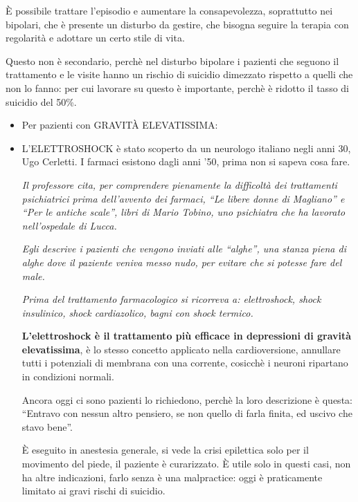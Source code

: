 \documentclass[]{article}
\begin{document}
È possibile trattare l'episodio e aumentare la consapevolezza,
soprattutto nei bipolari, che è presente un disturbo da gestire, che
bisogna seguire la terapia con regolarità e adottare un certo stile di
vita.

Questo non è secondario, perchè nel disturbo bipolare i pazienti che
seguono il trattamento e le visite hanno un rischio di suicidio
dimezzato rispetto a quelli che non lo fanno: per cui lavorare su questo
è importante, perchè è ridotto il tasso di suicidio del 50\%.

\begin{itemize}
\item
  Per pazienti con GRAVITÀ ELEVATISSIMA:
\end{itemize}

\begin{itemize}
\item
  L'ELETTROSHOCK è stato scoperto da un neurologo italiano negli anni
  30, Ugo Cerletti. I farmaci esistono dagli anni '50, prima non si
  sapeva cosa fare.

  \emph{Il professore cita, per comprendere pienamente la difficoltà dei
  trattamenti psichiatrici prima dell'avvento dei farmaci, ``Le libere
  donne di Magliano'' e ``Per le antiche scale'', libri di Mario Tobino,
  uno psichiatra che ha lavorato nell'ospedale di Lucca.}

  \emph{Egli descrive i pazienti che vengono inviati alle ``alghe'', una
  stanza piena di alghe dove il paziente veniva messo nudo, per evitare
  che si potesse fare del male.}

  \emph{Prima del trattamento farmacologico si ricorreva a:
  elettroshock, shock insulinico, shock cardiazolico, bagni con shock
  termico.}

  \textbf{L'elettroshock è il trattamento più efficace in depressioni di
  gravità elevatissima}, è lo stesso concetto applicato nella
  cardioversione, annullare tutti i potenziali di membrana con una
  corrente, cosicchè i neuroni ripartano in condizioni normali.

  Ancora oggi ci sono pazienti lo richiedono, perchè la loro descrizione
  è questa: ``Entravo con nessun altro pensiero, se non quello di farla
  finita, ed uscivo che stavo bene''.

  È eseguito in anestesia generale, si vede la crisi epilettica solo per
  il movimento del piede, il paziente è curarizzato. È utile solo in
  questi casi, non ha altre indicazioni, farlo senza è una malpractice:
  oggi è praticamente limitato ai gravi rischi di suicidio.
\end{itemize}
\end{document}
